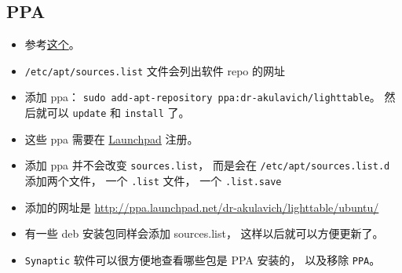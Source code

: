 \subsection{PPA}
\begin{itemize}
\item 参考\href{https://itsfoss.com/ppa-guide/}{这个}。
\item \verb|/etc/apt/sources.list| 文件会列出软件 repo 的网址
\item 添加 ppa： \verb|sudo add-apt-repository ppa:dr-akulavich/lighttable|。 然后就可以 \verb|update| 和 \verb|install| 了。
\item 这些 ppa 需要在 \href{https://launchpad.net/}{Launchpad} 注册。
\item 添加 ppa 并不会改变 \verb|sources.list|， 而是会在 \verb|/etc/apt/sources.list.d| 添加两个文件， 一个 \verb|.list| 文件， 一个 \verb|.list.save|
\item 添加的网址是 \href{http://ppa.launchpad.net/dr-akulavich/lighttable/ubuntu/}{http://ppa.launchpad.net/dr-akulavich/lighttable/ubuntu/}
\item 有一些 deb 安装包同样会添加 sources.list， 这样以后就可以方便更新了。
\item \verb|Synaptic| 软件可以很方便地查看哪些包是 PPA 安装的， 以及移除 \verb|PPA|。
\end{itemize}
